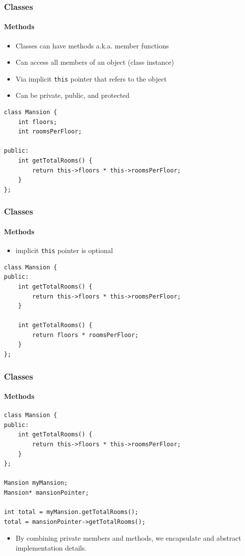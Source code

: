 \documentclass[table]{beamer}
\newcommand{\declarelesson}{\textbf{\color{themegreen}{Lesson:}} }
\begin{document}

\begin{frame}[fragile]
    \frametitle{\declarelesson Classes }
    \framesubtitle{Methods}
    \begin{itemize}
        \item Classes can have methods a.k.a. member functions
        \item Can access all members of an object (class instance)
        \item Via implicit \texttt{this} pointer that refers to the object
        \item Can be private, public, and protected 
    \end{itemize}
    \begin{lstlisting}[title=Writing a method]
class Mansion {
    int floors;
    int roomsPerFloor;

public:
    int getTotalRooms() {
        return this->floors * this->roomsPerFloor;
    }
};
    \end{lstlisting}
\end{frame}

\begin{frame}[fragile]
    \frametitle{\declarelesson Classes }
    \framesubtitle{Methods}
    \begin{itemize}
        \item implicit \texttt{this} pointer is optional
    \end{itemize}
    \begin{lstlisting}[title=Equivalent]
class Mansion {
public:
    int getTotalRooms() {
        return this->floors * this->roomsPerFloor;
    }

    int getTotalRooms() {
        return floors * roomsPerFloor;
    }
};
    \end{lstlisting}
\end{frame}

\begin{frame}[fragile]
    \frametitle{\declarelesson Classes }
    \framesubtitle{Methods}
    \begin{lstlisting}[title=Using a method]
class Mansion {
public:
    int getTotalRooms() {
        return this->floors * this->roomsPerFloor;
    }
};

Mansion myMansion;
Mansion* mansionPointer;

int total = myMansion.getTotalRooms();
total = mansionPointer->getTotalRooms();
    \end{lstlisting}
    \begin{itemize}
        \item By combining private members and methods, we encapsulate and
            abstract implementation details.
    \end{itemize}
\end{frame}
\end{document}
